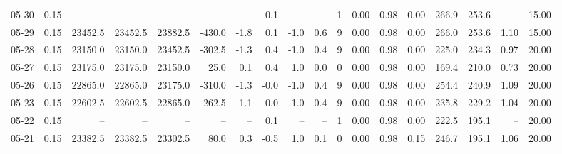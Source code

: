 \begin{threeparttable}
{\begin{tabular}{lrrrrrrrrrrrrrrrrr}
  05-30 &     0.15 &      -- &      -- &      -- &         -- &             -- &                       0.1 &                       -- &                  -- &              1 &       0.00 &      0.98 &           0.00 &            266.9 &               253.6 &              -- &                  15.00 \\
  05-29 &     0.15 & 23452.5 & 23452.5 & 23882.5 &     -430.0 &           -1.8 &                       0.1 &                     -1.0 &                 0.6 &              9 &       0.00 &      0.98 &           0.00 &            266.0 &               253.6 &            1.10 &                  15.00 \\
  05-28 &     0.15 & 23150.0 & 23150.0 & 23452.5 &     -302.5 &           -1.3 &                       0.4 &                     -1.0 &                 0.4 &              9 &       0.00 &      0.98 &           0.00 &            225.0 &               234.3 &            0.97 &                  20.00 \\
  05-27 &     0.15 & 23175.0 & 23175.0 & 23150.0 &       25.0 &            0.1 &                       0.4 &                      1.0 &                 0.0 &              0 &       0.00 &      0.98 &           0.00 &            169.4 &               210.0 &            0.73 &                  20.00 \\
  05-26 &     0.15 & 22865.0 & 22865.0 & 23175.0 &     -310.0 &           -1.3 &                      -0.0 &                     -1.0 &                 0.4 &              9 &       0.00 &      0.98 &           0.00 &            254.4 &               240.9 &            1.09 &                  20.00 \\
  05-23 &     0.15 & 22602.5 & 22602.5 & 22865.0 &     -262.5 &           -1.1 &                      -0.0 &                     -1.0 &                 0.4 &              9 &       0.00 &      0.98 &           0.00 &            235.8 &               229.2 &            1.04 &                  20.00 \\
  05-22 &     0.15 &      -- &      -- &      -- &         -- &             -- &                       0.1 &                       -- &                  -- &              1 &       0.00 &      0.98 &           0.00 &            222.5 &               195.1 &              -- &                  20.00 \\
  05-21 &     0.15 & 23382.5 & 23382.5 & 23302.5 &       80.0 &            0.3 &                      -0.5 &                      1.0 &                 0.1 &              0 &       0.00 &      0.98 &           0.15 &            246.7 &               195.1 &            1.06 &                  20.00 \\

\end{tabular}}
\end{threeparttable}
